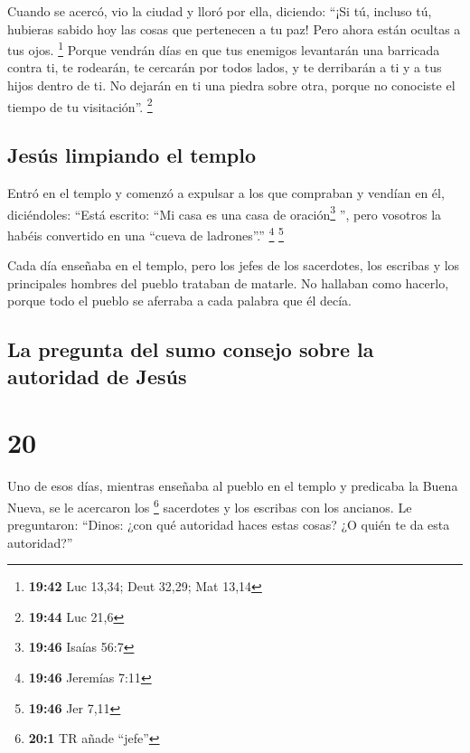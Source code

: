  Cuando se acercó, vio la ciudad y lloró por ella,
 diciendo: ``¡Si tú, incluso tú, hubieras sabido hoy las
cosas que pertenecen a tu paz! Pero ahora están ocultas a tus ojos.
\footnote{\textbf{19:42} Luc 13,34; Deut 32,29; Mat 13,14}
 Porque vendrán días en que tus enemigos levantarán una
barricada contra ti, te rodearán, te cercarán por todos lados,
 y te derribarán a ti y a tus hijos dentro de ti. No
dejarán en ti una piedra sobre otra, porque no conociste el tiempo de tu
visitación''. \footnote{\textbf{19:44} Luc 21,6}

\hypertarget{jesuxfas-limpiando-el-templo}{%
\subsection{Jesús limpiando el
templo}\label{jesuxfas-limpiando-el-templo}}

 Entró en el templo y comenzó a expulsar a los que
compraban y vendían en él,  diciéndoles: ``Está escrito:
``Mi casa es una casa de oración\footnote{\textbf{19:46} Isaías 56:7}
'', pero vosotros la habéis convertido en una ``cueva de ladrones''.''
\footnote{\textbf{19:46} Jeremías 7:11} \footnote{\textbf{19:46} Jer
  7,11}

 Cada día enseñaba en el templo, pero los jefes de los
sacerdotes, los escribas y los principales hombres del pueblo trataban
de matarle.  No hallaban como hacerlo, porque todo el
pueblo se aferraba a cada palabra que él decía.

\hypertarget{la-pregunta-del-sumo-consejo-sobre-la-autoridad-de-jesuxfas}{%
\subsection{La pregunta del sumo consejo sobre la autoridad de
Jesús}\label{la-pregunta-del-sumo-consejo-sobre-la-autoridad-de-jesuxfas}}

\hypertarget{section-19}{%
\section{20}\label{section-19}}

 Uno de esos días, mientras enseñaba al pueblo en el
templo y predicaba la Buena Nueva, se le acercaron los \footnote{\textbf{20:1}
  TR añade ``jefe''} sacerdotes y los escribas con los ancianos.
 Le preguntaron: ``Dinos: ¿con qué autoridad haces estas
cosas? ¿O quién te da esta autoridad?''

